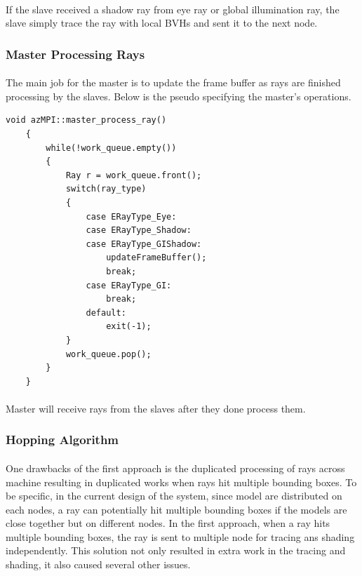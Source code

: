 \documentclass[a4paper, oneside, 10pt]{article}
\begin{document}
\paragraph{} If the slave received a shadow ray from eye ray or global illumination ray, the slave simply trace the ray with local BVHs and sent it to the next node.

\subsubsection{Master Processing Rays}
\paragraph{} The main job for the master is to update the frame buffer as rays are finished processing by the slaves. Below is the pseudo specifying the master's operations.
 \begin{lstlisting}[frame=single] 
    void azMPI::master_process_ray()
    {
        while(!work_queue.empty())
        {
            Ray r = work_queue.front();
            switch(ray_type)
            {
                case ERayType_Eye:
                case ERayType_Shadow:
                case ERayType_GIShadow:
                    updateFrameBuffer();
                    break;
                case ERayType_GI:
                    break;
                default:
                    exit(-1);
            }
            work_queue.pop();
        }
    }
\end{lstlisting}
\paragraph{} Master will receive rays from the slaves after they done process them.
\subsubsection{Hopping Algorithm}
\paragraph{} One drawbacks of the first approach is the duplicated processing of rays across machine resulting in duplicated works when rays hit multiple bounding boxes. To be specific, in the current design of the system, since model are distributed on each nodes, a ray can potentially hit multiple bounding boxes if the models are close together but on different nodes.  In the first approach, when a ray hits multiple bounding boxes, the ray is sent to multiple node for tracing ans shading independently. This solution not only resulted in extra work in the tracing and shading, it also caused several other issues.
\end{document}
